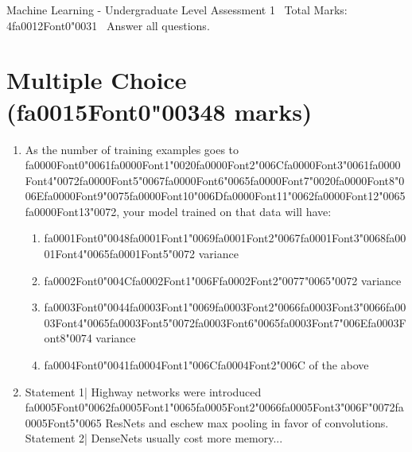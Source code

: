 \documentclass[{\csname fa0013Font0\endcsname\char"0032}{\csname fa0014Font0\endcsname\char"0031}pt]{article}
\begin{document}
\begin{center}
Machine Learning - Undergraduate Level Assessment 1 \
Total Marks: 4{\csname fa0012Font0\endcsname\char"0031} \
Answer all questions.
\end{center}

\section*{Multiple Choice ({\csname fa0015Font0\endcsname\char"0034}8 marks)}
\begin{enumerate}[label=\arabic*.]
\item As the number of training examples goes to {\csname fa0000Font0\endcsname\char"0061}{\csname fa0000Font1\endcsname\char"0020}{\csname fa0000Font2\endcsname\char"006C}{\csname fa0000Font3\endcsname\char"0061}{\csname fa0000Font4\endcsname\char"0072}{\csname fa0000Font5\endcsname\char"0067}{\csname fa0000Font6\endcsname\char"0065}{\csname fa0000Font7\endcsname\char"0020}{\csname fa0000Font8\endcsname\char"006E}{\csname fa0000Font9\endcsname\char"0075}{\csname fa0000Font10\endcsname\char"006D}{\csname fa0000Font11\endcsname\char"0062}{\csname fa0000Font12\endcsname\char"0065}{\csname fa0000Font13\endcsname\char"0072}, your model trained on that data will have:
\begin{enumerate}[label=(\alph*)]
    \item {\csname fa0001Font0\endcsname\char"0048}{\csname fa0001Font1\endcsname\char"0069}{\csname fa0001Font2\endcsname\char"0067}{\csname fa0001Font3\endcsname\char"0068}{\csname fa0001Font4\endcsname\char"0065}{\csname fa0001Font5\endcsname\char"0072} variance
    \item {\csname fa0002Font0\endcsname\char"004C}{\csname fa0002Font1\endcsname\char"006F}{\csname fa0002Font2\endcsname\char"0077}{\char"0065}{\char"0072} variance
    \item {\csname fa0003Font0\endcsname\char"0044}{\csname fa0003Font1\endcsname\char"0069}{\csname fa0003Font2\endcsname\char"0066}{\csname fa0003Font3\endcsname\char"0066}{\csname fa0003Font4\endcsname\char"0065}{\csname fa0003Font5\endcsname\char"0072}{\csname fa0003Font6\endcsname\char"0065}{\csname fa0003Font7\endcsname\char"006E}{\csname fa0003Font8\endcsname\char"0074} variance
    \item {\csname fa0004Font0\endcsname\char"0041}{\csname fa0004Font1\endcsname\char"006C}{\csname fa0004Font2\endcsname\char"006C} of the above
\end{enumerate}
\item Statement 1| Highway networks were introduced {\csname fa0005Font0\endcsname\char"0062}{\csname fa0005Font1\endcsname\char"0065}{\csname fa0005Font2\endcsname\char"0066}{\csname fa0005Font3\endcsname\char"006F}{\char"0072}{\csname fa0005Font5\endcsname\char"0065} ResNets and eschew max pooling in favor of convolutions. Statement 2| DenseNets usually cost more memory...

\end{enumerate}
\end{document}
